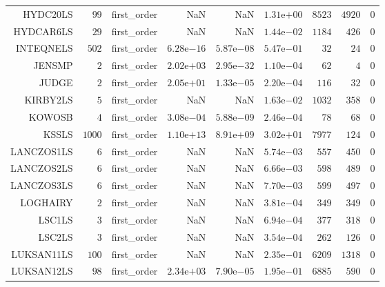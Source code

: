 \begin{longtable}{rrrrrrrrr}
HYDC20LS & \(    99\) & first\_order &       NaN &       NaN & \( 1.31\)e\(+00\) & \(  8523\) & \(  4920\) & \(     0\) \\
HYDCAR6LS & \(    29\) & first\_order &       NaN &       NaN & \( 1.44\)e\(-02\) & \(  1184\) & \(   426\) & \(     0\) \\
INTEQNELS & \(   502\) & first\_order & \( 6.28\)e\(-16\) & \( 5.87\)e\(-08\) & \( 5.47\)e\(-01\) & \(    32\) & \(    24\) & \(     0\) \\
JENSMP & \(     2\) & first\_order & \( 2.02\)e\(+03\) & \( 2.95\)e\(-32\) & \( 1.10\)e\(-04\) & \(    62\) & \(     4\) & \(     0\) \\
JUDGE & \(     2\) & first\_order & \( 2.05\)e\(+01\) & \( 1.33\)e\(-05\) & \( 2.20\)e\(-04\) & \(   116\) & \(    32\) & \(     0\) \\
KIRBY2LS & \(     5\) & first\_order &       NaN &       NaN & \( 1.63\)e\(-02\) & \(  1032\) & \(   358\) & \(     0\) \\
KOWOSB & \(     4\) & first\_order & \( 3.08\)e\(-04\) & \( 5.88\)e\(-09\) & \( 2.46\)e\(-04\) & \(    78\) & \(    68\) & \(     0\) \\
KSSLS & \(  1000\) & first\_order & \( 1.10\)e\(+13\) & \( 8.91\)e\(+09\) & \( 3.02\)e\(+01\) & \(  7977\) & \(   124\) & \(     0\) \\
LANCZOS1LS & \(     6\) & first\_order &       NaN &       NaN & \( 5.74\)e\(-03\) & \(   557\) & \(   450\) & \(     0\) \\
LANCZOS2LS & \(     6\) & first\_order &       NaN &       NaN & \( 6.66\)e\(-03\) & \(   598\) & \(   489\) & \(     0\) \\
LANCZOS3LS & \(     6\) & first\_order &       NaN &       NaN & \( 7.70\)e\(-03\) & \(   599\) & \(   497\) & \(     0\) \\
LOGHAIRY & \(     2\) & first\_order &       NaN &       NaN & \( 3.81\)e\(-04\) & \(   349\) & \(   349\) & \(     0\) \\
LSC1LS & \(     3\) & first\_order &       NaN &       NaN & \( 6.94\)e\(-04\) & \(   377\) & \(   318\) & \(     0\) \\
LSC2LS & \(     3\) & first\_order &       NaN &       NaN & \( 3.54\)e\(-04\) & \(   262\) & \(   126\) & \(     0\) \\
LUKSAN11LS & \(   100\) & first\_order &       NaN &       NaN & \( 2.35\)e\(-01\) & \(  6209\) & \(  1318\) & \(     0\) \\
LUKSAN12LS & \(    98\) & first\_order & \( 2.34\)e\(+03\) & \( 7.90\)e\(-05\) & \( 1.95\)e\(-01\) & \(  6885\) & \(   590\) & \(     0\) \\

\end{longtable}

